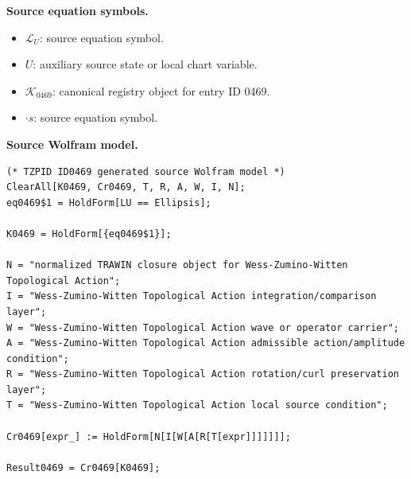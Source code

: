\begin{minipage}[t]{0.49\linewidth}
\begingroup
\small
\raggedright
\textbf{Source equation symbols.}\par
\begin{itemize}[leftmargin=1.35em,itemsep=1pt,topsep=1pt,parsep=0pt]
    \item $\mathcal{L}_{U}$: source equation symbol.
    \item $U$: auxiliary source state or local chart variable.
    \item $\mathcal{K}_{0469}$: canonical registry object for entry ID 0469.
    \item $\cdot s$: source equation symbol.
\end{itemize}
\endgroup
\end{minipage}\hfill
\begin{minipage}[t]{0.47\linewidth}
\begingroup
\scriptsize
\raggedright
\textbf{Source Wolfram model.}\par
\begin{Verbatim}[fontsize=\tiny,breaklines=true,breakanywhere=true]
(* TZPID ID0469 generated source Wolfram model *)
ClearAll[K0469, Cr0469, T, R, A, W, I, N];
eq0469$1 = HoldForm[LU == Ellipsis];

K0469 = HoldForm[{eq0469$1}];

N = "normalized TRAWIN closure object for Wess-Zumino-Witten Topological Action";
I = "Wess-Zumino-Witten Topological Action integration/comparison layer";
W = "Wess-Zumino-Witten Topological Action wave or operator carrier";
A = "Wess-Zumino-Witten Topological Action admissible action/amplitude condition";
R = "Wess-Zumino-Witten Topological Action rotation/curl preservation layer";
T = "Wess-Zumino-Witten Topological Action local source condition";

Cr0469[expr_] := HoldForm[N[I[W[A[R[T[expr]]]]]]];

Result0469 = Cr0469[K0469];
\end{Verbatim}
\endgroup
\end{minipage}

